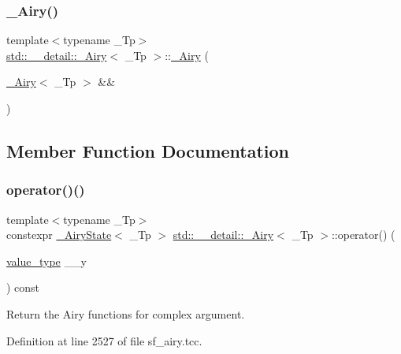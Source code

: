 \subsubsection{\texorpdfstring{\+\_\+\+Airy()}{\_Airy()}\hspace{0.1cm}{\footnotesize\ttfamily [3/3]}}
{\footnotesize\ttfamily template$<$typename \+\_\+\+Tp$>$ \\
\hyperlink{classstd_1_1____detail_1_1__Airy}{std\+::\+\_\+\+\_\+detail\+::\+\_\+\+Airy}$<$ \+\_\+\+Tp $>$\+::\hyperlink{classstd_1_1____detail_1_1__Airy}{\+\_\+\+Airy} (\begin{DoxyParamCaption}\item[{\hyperlink{classstd_1_1____detail_1_1__Airy}{\+\_\+\+Airy}$<$ \+\_\+\+Tp $>$ \&\&}]{ }\end{DoxyParamCaption})\hspace{0.3cm}{\ttfamily [default]}}



\subsection{Member Function Documentation}
\mbox{\label{classstd_1_1____detail_1_1__Airy_aae4af53f88751d35b028055a2f8c5e2b}} 
\subsubsection{\texorpdfstring{operator()()}{operator()()}}
{\footnotesize\ttfamily template$<$typename \+\_\+\+Tp$>$ \\
constexpr \hyperlink{structstd_1_1____detail_1_1__AiryState}{\+\_\+\+Airy\+State}$<$ \+\_\+\+Tp $>$ \hyperlink{classstd_1_1____detail_1_1__Airy}{std\+::\+\_\+\+\_\+detail\+::\+\_\+\+Airy}$<$ \+\_\+\+Tp $>$\+::operator() (\begin{DoxyParamCaption}\item[{\hyperlink{classstd_1_1____detail_1_1__Airy_a99e7e546930fbd7a846f6933a9b4b437}{value\+\_\+type}}]{\+\_\+\+\_\+y }\end{DoxyParamCaption}) const}

Return the Airy functions for complex argument. 

Definition at line 2527 of file sf\+\_\+airy.\+tcc.



